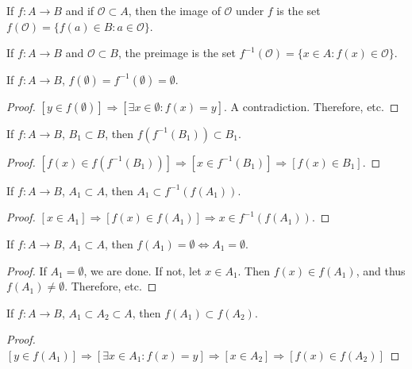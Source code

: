 \documentclass[crop=false,class=book,oneside]{standalone}
\begin{document}
        \begin{definition}
        If $f:A\rightarrow B$ and if $\mathcal{O}\subset A$, then the image of $\mathcal{O}$ under $f$ is the set $f(\mathcal{O}) = \{f(a)\in B:a\in \mathcal{O}\}$.
        \end{definition}
        \begin{definition}
        If $f:A\rightarrow B$ and $\mathscr{O}\subset B$, the preimage is the set $f^{-1}(\mathscr{O}) = \{x\in A:f(x)\in \mathscr{O}\}$.
        \end{definition}
        \begin{corollary}
        If $f:A\rightarrow B$, $f(\emptyset) = f^{-1}(\emptyset) = \emptyset$.
        \end{corollary}
        \begin{proof}
        $[y\in f(\emptyset)]\Rightarrow [\exists x\in \emptyset:f(x)=y]$. A contradiction. Therefore, etc.
        \end{proof}
        \begin{theorem}
        If $f:A\rightarrow B$, $B_1\subset B$, then $f(f^{-1}(B_1))\subset B_1$.
        \end{theorem}
        \begin{proof}
        $[f(x)\in f(f^{-1}(B_1))]\Rightarrow [x\in f^{-1}(B_1)]\Rightarrow [f(x)\in B_1]$.
        \end{proof}
        \begin{theorem}
        If $f:A\rightarrow B$, $A_1\subset A$, then $A_1\subset f^{-1}(f(A_1))$.
        \end{theorem}
        \begin{proof}
        $[x\in A_1]\Rightarrow [f(x) \in f(A_1)]\Rightarrow x\in f^{-1}(f(A_1))$.
        \end{proof}
        \begin{theorem}
        If $f:A\rightarrow B$, $A_1\subset A$, then $f(A_1) = \emptyset \Leftrightarrow A_1 = \emptyset$.
        \end{theorem}
        \begin{proof}
        If $A_1 = \emptyset$, we are done. If not, let $x\in A_1$. Then $f(x)\in f(A_1)$, and thus $f(A_1)\ne \emptyset$. Therefore, etc.
        \end{proof}
        \begin{corollary}
        If $f:A\rightarrow B$, $A_1\subset A_2\subset A$, then $f(A_1)\subset f(A_2)$.
        \end{corollary}
        \begin{proof}
        $[y\in f(A_1)]\Rightarrow[\exists x\in A_1:f(x)=y]\Rightarrow [x\in A_2] \Rightarrow [f(x)\in f(A_2)]$
        \end{proof}
\end{document}
